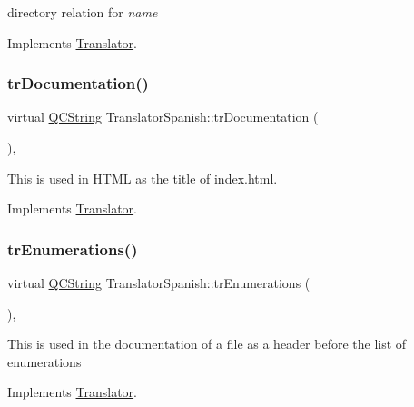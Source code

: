 directory relation for {\itshape name} 

Implements \mbox{\hyperlink{class_translator}{Translator}}.

\mbox{\label{class_translator_spanish_afc2466e86fec5063e6324c172d262a9c}} 
\subsubsection{\texorpdfstring{trDocumentation()}{trDocumentation()}}
{\footnotesize\ttfamily virtual \mbox{\hyperlink{class_q_c_string}{Q\+C\+String}} Translator\+Spanish\+::tr\+Documentation (\begin{DoxyParamCaption}{ }\end{DoxyParamCaption})\hspace{0.3cm}{\ttfamily [inline]}, {\ttfamily [virtual]}}

This is used in H\+T\+ML as the title of index.\+html. 

Implements \mbox{\hyperlink{class_translator}{Translator}}.

\mbox{\label{class_translator_spanish_a65d3ae1df4addbc8a79131e23af70954}} 
\subsubsection{\texorpdfstring{trEnumerations()}{trEnumerations()}}
{\footnotesize\ttfamily virtual \mbox{\hyperlink{class_q_c_string}{Q\+C\+String}} Translator\+Spanish\+::tr\+Enumerations (\begin{DoxyParamCaption}{ }\end{DoxyParamCaption})\hspace{0.3cm}{\ttfamily [inline]}, {\ttfamily [virtual]}}

This is used in the documentation of a file as a header before the list of enumerations 

Implements \mbox{\hyperlink{class_translator}{Translator}}.

\mbox{\label{class_translator_spanish_a9989b2984c3a27d9b2d4706317862289}} 
